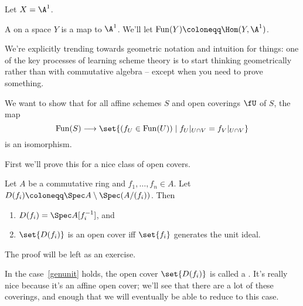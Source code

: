 Let $X = \A^1$.
\begin{defn}
A  on a space $Y$ is a map to $\A^1$. We'll let $\Fun(Y)\coloneqq\Hom(Y, \A^1)$.
\end{defn}
We're explicitly trending towards geometric notation and intuition for things: one of the key processes of learning
scheme theory is to start thinking geometrically rather than with commutative algebra -- except when you need to
prove something.

We want to show that for all affine schemes $S$ and open coverings $\fU$ of $S$, the map
\begin{equation}
\label{fun(S)}
	\Fun(S)\longrightarrow \set{(f_U\in\Fun(U))\mid f_U|_{U\cap V} = f_V|_{U\cap V}}
\end{equation}
is an isomorphism.

First we'll prove this for a nice class of open covers.
\begin{lem}
\label{basiclem}
Let $A$ be a commutative ring and $f_1,\dotsc,f_n\in A$. Let $D(f_i)\coloneqq \Spec
A\setminus\Spec(A/(f_i))$. Then
\begin{enumerate}
	\item $D(f_i) = \Spec A[f_i^{-1}]$, and
	\item\label{genunit} $\set{D(f_i)}$ is an open cover iff $\set{f_i}$ generates the unit ideal.
\end{enumerate}
\end{lem}
The proof will be left as an exercise.

In the case~\eqref{genunit} holds, the open cover $\set{D(f_i)}$ is called a . It's really
nice because it's an affine open cover; we'll see that there are a lot of these coverings, and enough that we will
eventually be able to reduce to this case.

